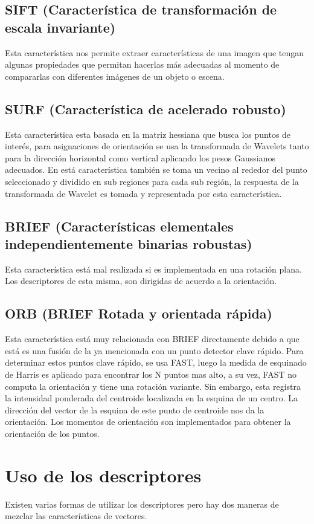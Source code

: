 \subsection{SIFT (Característica de transformación de escala invariante)}
 Esta característica nos permite extraer características de una imagen que tengan algunas propiedades que permitan hacerlas más adecuadas al momento de compararlas con diferentes imágenes de un objeto o escena.
 
\subsection{SURF (Característica de acelerado robusto)}
Esta característica esta basada en la matriz hessiana que busca los puntos de interés, para asignaciones de orientación se usa la transformada de Wavelets tanto para la dirección horizontal como vertical aplicando los pesos Gaussianos adecuados. En está característica también se toma un vecino al rededor del punto seleccionado y dividido en sub regiones para cada sub región, la respuesta de la transformada de Wavelet es tomada y representada por esta característica.

\subsection{BRIEF (Características elementales  independientemente binarias robustas)}
Esta característica está mal realizada si es implementada en una rotación plana. Los descriptores de esta misma, son dirigidas de acuerdo a la orientación.

\subsection{ORB (BRIEF Rotada y orientada rápida)}
Esta característica está muy relacionada con BRIEF directamente debido a que está es una fusión de la ya mencionada con un punto detector clave rápido. Para determinar estos puntos clave rápido, se usa FAST, luego la medida de esquinado de Harris es aplicado para encontrar los N puntos mas alto, a su vez, FAST no computa la orientación y tiene una rotación variante. Sin embargo, esta registra la intensidad ponderada del centroide localizada en la esquina de un centro. La dirección del vector de la esquina de este punto de centroide nos da la orientación. Los momentos de orientación son implementados para obtener la orientación de los puntos.


\section{Uso de los descriptores}
Existen varias formas de utilizar los descriptores pero hay dos maneras de mezclar las características de vectores.

